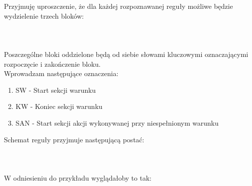 

Przyjmuję uproszczenie, że dla każdej rozpoznawanej reguły możliwe będzie wydzielenie trzech bloków:
\\ \\
\\ \\
Poszczególne bloki oddzielone będą od siebie słowami kluczowymi oznaczającymi rozpoczęcie i zakończenie bloku. \\

Wprowadzam następujące oznaczenia:
\begin{enumerate}
	\item SW - Start sekcji warunku
	\item KW - Koniec sekcji warunku
	\item SAN - Start sekcji akcji wykonywanej przy niespełnionym warunku
\end{enumerate}
Schemat reguły przyjmuje następującą postać:
\\ \\
\\ \\

W odniesieniu do przykładu wyglądałoby to tak:
\\ \\
\\ \\
